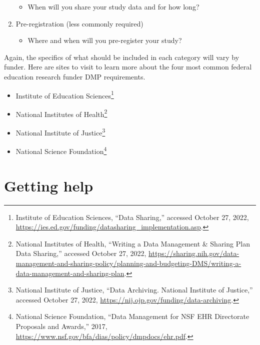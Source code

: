 \documentclass[
]{book}
\providecommand{\tightlist}{%
  \setlength{\itemsep}{0pt}\setlength{\parskip}{0pt}}
\begin{document}
\begin{enumerate}
  \begin{itemize}
  \tightlist
  \item
    When will you share your study data and for how long?
  \end{itemize}
\item
  Pre-registration (less commonly required)

  \begin{itemize}
  \tightlist
  \item
    Where and when will you pre-register your study?
  \end{itemize}
\end{enumerate}

Again, the specifics of what should be included in each category will vary by funder. Here are sites to visit to learn more about the four most common federal education research funder DMP requirements.

\begin{itemize}
\tightlist
\item
  Institute of Education Sciences\footnote{Institute of Education Sciences, {``Data Sharing,''} accessed October 27, 2022, \url{https://ies.ed.gov/funding/datasharing_implementation.asp}.}
\item
  National Institutes of Health\footnote{National Institutes of Health, {``Writing a Data Management \& Sharing Plan {\textbar} Data Sharing,''} accessed October 27, 2022, \url{https://sharing.nih.gov/data-management-and-sharing-policy/planning-and-budgeting-DMS/writing-a-data-management-and-sharing-plan}.}
\item
  National Institute of Justice\footnote{National Institute of Justice, {``Data Archiving. National Institute of Justice,''} accessed October 27, 2022, \url{https://nij.ojp.gov/funding/data-archiving}.}
\item
  National Science Foundation\footnote{National Science Foundation, {``Data Management for {NSF} {EHR} Directorate Proposals and Awards,''} 2017, \url{https://www.nsf.gov/bfa/dias/policy/dmpdocs/ehr.pdf}.}
\end{itemize}

\hypertarget{getting-help}{%
\section{Getting help}\label{getting-help}}
\end{document}
